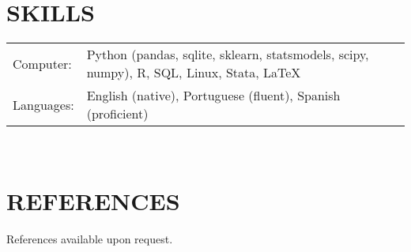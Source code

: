 \documentclass[margin]{res}  %
\begin{document}
\begin{resume}
\section{\textnormal{SKILLS}}
   \begin{tabular}{l p{3in}}
       Computer: &  Python (pandas, sqlite, sklearn, statsmodels, scipy, numpy), R, SQL, Linux, Stata, \LaTeX \\[12pt]
        Languages: & English (native), Portuguese (fluent), Spanish (proficient)
 \end{tabular}
\\

\section{\textnormal{REFERENCES}}

References available upon request.

%

\end{resume} 

%
\end{document}
